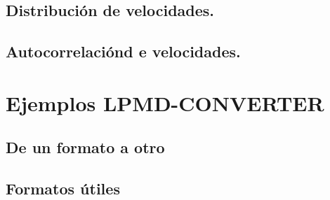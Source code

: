 \subsection{Distribuci\'on de velocidades.}

\subsection{Autocorrelaci\'ond e velocidades.}

\section{Ejemplos LPMD-CONVERTER}

\subsection{De un formato a otro}

\subsection{Formatos \'utiles}
